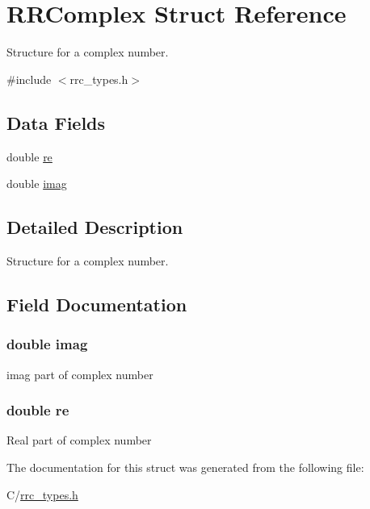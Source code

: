 \hypertarget{struct_r_r_complex}{\section{R\-R\-Complex Struct Reference}
\label{struct_r_r_complex}
}


Structure for a complex number.  




{\ttfamily \#include $<$rrc\-\_\-types.\-h$>$}

\subsection*{Data Fields}
\begin{DoxyCompactItemize}
\item 
double \hyperlink{struct_r_r_complex_a5a6fce2fc5cae153945fea2c45beeb4f}{re}
\item 
double \hyperlink{struct_r_r_complex_a9aace20780eedccdde9fe2352ee4fb05}{imag}
\end{DoxyCompactItemize}


\subsection{Detailed Description}
Structure for a complex number. 

\subsection{Field Documentation}
\hypertarget{struct_r_r_complex_a9aace20780eedccdde9fe2352ee4fb05}{
\subsubsection[{imag}]{\setlength{\rightskip}{0pt plus 5cm}double imag}}\label{struct_r_r_complex_a9aace20780eedccdde9fe2352ee4fb05}
imag part of complex number \hypertarget{struct_r_r_complex_a5a6fce2fc5cae153945fea2c45beeb4f}{
\subsubsection[{re}]{\setlength{\rightskip}{0pt plus 5cm}double re}}\label{struct_r_r_complex_a5a6fce2fc5cae153945fea2c45beeb4f}
Real part of complex number 

The documentation for this struct was generated from the following file\-:\begin{DoxyCompactItemize}
\item 
C/\hyperlink{rrc__types_8h}{rrc\-\_\-types.\-h}\end{DoxyCompactItemize}
